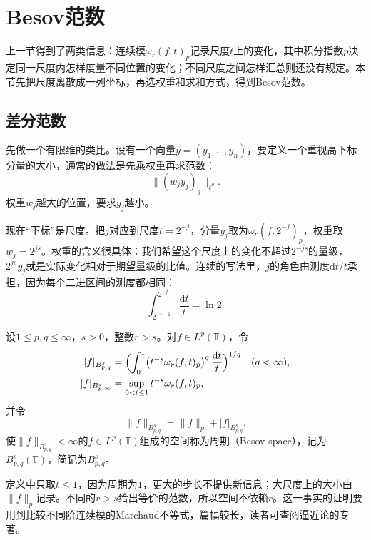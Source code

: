 \section{Besov范数}
\label{sec:besov-norms}

上一节得到了两类信息：连续模$\omega_r(f,t)_p$记录尺度$t$上的变化，其中积分指数$p$决定同一尺度内怎样度量不同位置的变化；不同尺度之间怎样汇总则还没有规定。本节先把尺度离散成一列坐标，再选权重和求和方式，得到Besov范数。

\subsection{差分范数}
\label{sec:besov-difference-norm}

先做一个有限维的类比。设有一个向量$y=(y_1,\ldots,y_n)$，要定义一个重视高下标分量的大小，通常的做法是先乘权重再求范数：
\[
 \bigl\lVert(w_jy_j)_j\bigr\rVert_{\ell^q}.
\]
权重$w_j$越大的位置，要求$y_j$越小。

现在“下标”是尺度。把$j$对应到尺度$t=2^{-j}$，分量$y_j$取为$\omega_r(f,2^{-j})_p$，权重取$w_j=2^{js}$。权重的含义很具体：我们希望这个尺度上的变化不超过$2^{-js}$的量级，$2^{js}y_j$就是实际变化相对于期望量级的比值。连续的写法里，$j$的角色由测度$\mathrm dt/t$承担，因为每个二进区间的测度都相同：
\[
 \int_{2^{-j-1}}^{2^{-j}}\frac{\mathrm dt}{t}=\ln2 .
\]

\begin{definition}[周期Besov空间]
\label{def:besov-space}
设$1\leq p,q\leq\infty$，$s>0$，整数$r>s$。对$f\in L^p(\mathbb T)$，令
\begin{equation}
 \begin{aligned}
 \lvert f\rvert_{B^s_{p,q}}&=\Bigl(\int_0^1\bigl(t^{-s}\omega_r(f,t)_p\bigr)^q\,\frac{\mathrm dt}{t}\Bigr)^{1/q}\quad(q<\infty),\\
 \lvert f\rvert_{B^s_{p,\infty}}&=\sup_{0<t\leq1}t^{-s}\omega_r(f,t)_p ,
 \end{aligned}
 \label{eq:besov-seminorm}
\end{equation}
并令
\begin{equation}
 \lVert f\rVert_{B^s_{p,q}}=\lVert f\rVert_p+\lvert f\rvert_{B^s_{p,q}} .
 \label{eq:besov-norm}
\end{equation}
使$\lVert f\rVert_{B^s_{p,q}}<\infty$的$f\in L^p(\mathbb T)$组成的空间称为周期（Besov space），记为$B^s_{p,q}(\mathbb T)$，简记为$B^s_{p,q}$。
\end{definition}

定义中只取$t\leq1$，因为周期为$1$，更大的步长不提供新信息；大尺度上的大小由$\lVert f\rVert_p$记录。不同的$r>s$给出等价的范数，所以空间不依赖$r$。这一事实的证明要用到比较不同阶连续模的Marchaud不等式，篇幅较长，读者可查阅逼近论的专著。

